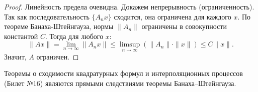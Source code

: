 \begin{proof}
	Линейность предела очевидна. Докажем непрерывность (ограниченность).
	Так как последовательность $\{A_n x\}$ сходится, она ограничена для каждого $x$.
	По теореме Банаха-Штейнгауза, нормы $\|A_n\|$ ограничены в совокупности константой $C$.
	Тогда для любого $x$:
	\[ \|Ax\| = \lim_{n \to \infty} \|A_n x\| \leqslant \limsup_{n \to \infty} (\|A_n\| \cdot \|x\|) \leqslant C \|x\|. \]
	Значит, $A$ ограничен.
\end{proof}

\begin{remark}
	Теоремы о сходимости квадратурных формул и интерполяционных процессов (Билет №16) являются прямыми следствиями теоремы Банаха--Штейнгауза.
\end{remark}